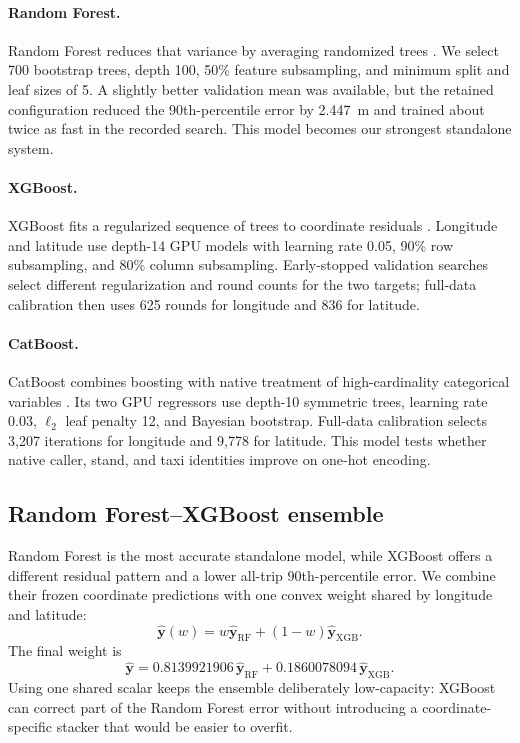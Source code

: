 \paragraph{Random Forest.}
Random Forest reduces that variance by averaging randomized trees \citep{breiman2001random}.  We select 700 bootstrap trees, depth 100, 50\% feature subsampling, and minimum split and leaf sizes of 5.  A slightly better validation mean was available, but the retained configuration reduced the 90th-percentile error by 2.447~m and trained about twice as fast in the recorded search.  This model becomes our strongest standalone system.

\paragraph{XGBoost.}
XGBoost fits a regularized sequence of trees to coordinate residuals \citep{chen2016xgboost}.  Longitude and latitude use depth-14 GPU models with learning rate 0.05, 90\% row subsampling, and 80\% column subsampling.  Early-stopped validation searches select different regularization and round counts for the two targets; full-data calibration then uses 625 rounds for longitude and 836 for latitude.

\paragraph{CatBoost.}
CatBoost combines boosting with native treatment of high-cardinality categorical variables \citep{prokhorenkova2018catboost}.  Its two GPU regressors use depth-10 symmetric trees, learning rate 0.03, $\ell_2$ leaf penalty 12, and Bayesian bootstrap.  Full-data calibration selects 3,207 iterations for longitude and 9,778 for latitude.  This model tests whether native caller, stand, and taxi identities improve on one-hot encoding.

\subsection{Random Forest--XGBoost ensemble}

Random Forest is the most accurate standalone model, while XGBoost offers a different residual pattern and a lower all-trip 90th-percentile error.  We combine their frozen coordinate predictions with one convex weight shared by longitude and latitude:
\begin{equation}
  \widehat{\boldsymbol y}(w)
  =w\widehat{\boldsymbol y}_{\mathrm{RF}}
  +(1-w)\widehat{\boldsymbol y}_{\mathrm{XGB}}.
  \label{eq:ensemble-blend}
\end{equation}
The final weight is
\begin{equation}
  \widehat{\boldsymbol y}
  =0.8139921906\,\widehat{\boldsymbol y}_{\mathrm{RF}}
  +0.1860078094\,\widehat{\boldsymbol y}_{\mathrm{XGB}}.
\end{equation}
Using one shared scalar keeps the ensemble deliberately low-capacity: XGBoost can correct part of the Random Forest error without introducing a coordinate-specific stacker that would be easier to overfit.
